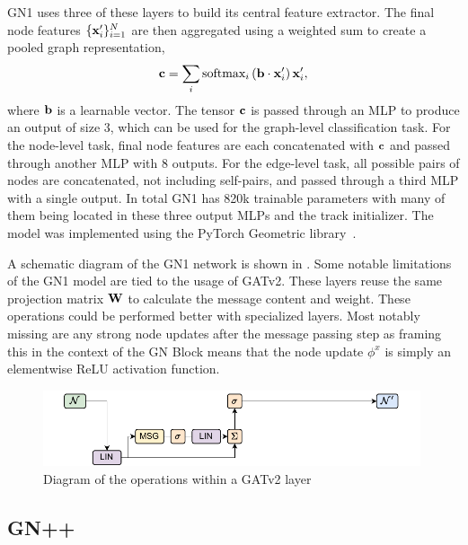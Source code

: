 GN1 uses three of these layers to build its central feature extractor.
The final node features $\{\mathbf{x}_i'\}_{i=1}^{N}$ are then aggregated using a weighted sum to create a pooled graph representation,
\begin{equation}
    \mathbf{c} = \sum_{i} \text{softmax}_i\left(\mathbf{b} \cdot \mathbf{x}_i'\right) \mathbf{x}_i',
\end{equation}
where $\mathbf{b}$ is a learnable vector.
The tensor $\mathbf{c}$ is passed through an MLP to produce an output of size 3, which can be used for the graph-level classification task.
For the node-level task, final node features are each concatenated with $\mathbf{c}$ and passed through another MLP with 8 outputs.
For the edge-level task, all possible pairs of nodes are concatenated, not including self-pairs, and passed through a third MLP with a single output.
In total GN1 has 820k trainable parameters with many of them being located in these three output MLPs and the track initializer.
The model was implemented using the PyTorch Geometric library~\cite{PYG}.

A schematic diagram of the GN1 network is shown in .
Some notable limitations of the GN1 model are tied to the usage of GATv2.
These layers reuse the same projection matrix $\mathbf{W}$ to calculate the message content and weight.
These operations could be performed better with specialized layers.
Most notably missing are any strong node updates after the message passing step as framing this in the context of the GN Block means that the node update $\phi^x$ is simply an elementwise ReLU activation function.

\begin{figure}
    \centering
    \includegraphics[width=0.99\textwidth]{figures/flavour_tagging/gn1.pdf}
    \caption{Diagram of the operations within a GATv2 layer~\cite{GATv2}}
    \label{fig:gn1_graph}
\end{figure}

\subsection{GN++}


